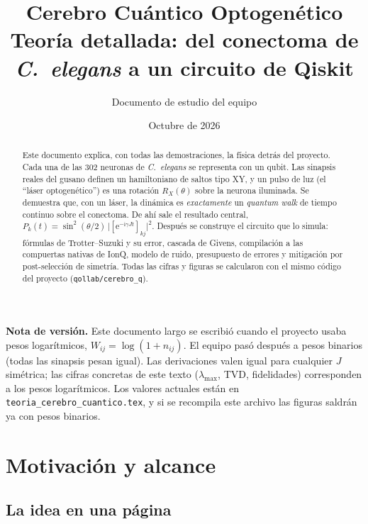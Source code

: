 \documentclass[11pt,a4paper]{article}
\title{\textbf{Cerebro Cuántico Optogenético}\\[4pt]
\large Teoría detallada: del conectoma de \emph{C.~elegans} a un circuito de Qiskit}
\author{Documento de estudio del equipo}
\date{Octubre de 2026}
\newcommand{\e}{\mathrm{e}}
\newcommand{\ii}{\mathrm{i}}
\newcommand{\RX}{R_X}
\newcommand{\code}[1]{\texttt{#1}}
\theoremstyle{plain}
\theoremstyle{definition}
\theoremstyle{remark}
\begin{document}
\maketitle

\begin{abstract}
\noindent
Este documento explica, con todas las demostraciones, la física detrás del proyecto. Cada una de las 302 neuronas de \emph{C.~elegans} se representa con un qubit. Las sinapsis reales del gusano definen un hamiltoniano de saltos tipo XY, y un pulso de luz (el ``láser optogenético'') es una rotación $\RX(\theta)$ sobre la neurona iluminada. Se demuestra que, con un láser, la dinámica es \emph{exactamente} un \emph{quantum walk} de tiempo continuo sobre el conectoma. De ahí sale el resultado central, $P_k(t)=\sin^2(\theta/2)\,\bigl|[\e^{-\ii\gamma J t}]_{kj}\bigr|^2$. Después se construye el circuito que lo simula: fórmulas de Trotter--Suzuki y su error, cascada de Givens, compilación a las compuertas nativas de IonQ, modelo de ruido, presupuesto de errores y mitigación por post-selección de simetría. Todas las cifras y figuras se calcularon con el mismo código del proyecto (\code{qollab/cerebro\_q}).
\end{abstract}

\begin{honestidad}
\textbf{Nota de versión.} Este documento largo se escribió cuando el proyecto usaba pesos logarítmicos, $W_{ij}=\log(1+n_{ij})$. El equipo pasó después a pesos binarios (todas las sinapsis pesan igual). Las derivaciones valen igual para cualquier $J$ simétrica; las cifras concretas de este texto ($\lambda_{\max}$, TVD, fidelidades) corresponden a los pesos logarítmicos. Los valores actuales están en \code{teoria\_cerebro\_cuantico.tex}, y si se recompila este archivo las figuras saldrán ya con pesos binarios.
\end{honestidad}

\tableofcontents
\newpage

\section{Motivación y alcance}
\label{sec:motivacion}

\subsection{La idea en una página}
\end{document}
